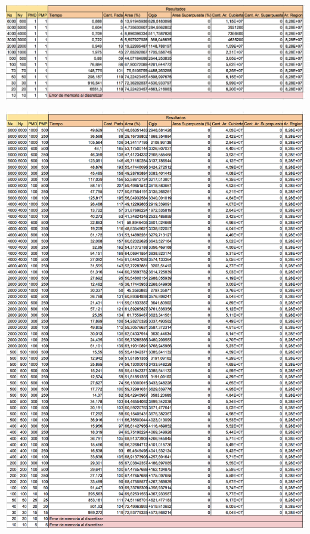 \begin{center}
\includegraphics[width=1\textwidth]{imagenes/G_45G110X90Y8E7AR}
\end{center}

\begin{center}
\includegraphics[width=1\textwidth]{imagenes/GML_45G110X90Y8E7AR}
\end{center}

